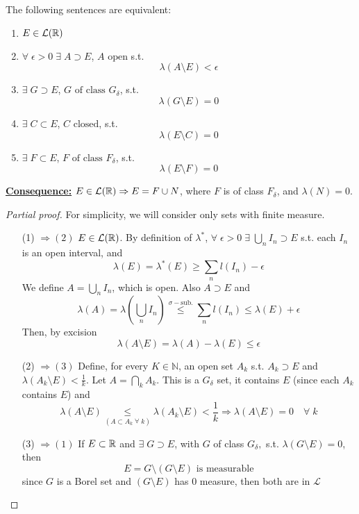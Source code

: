 \begin{theorem}
    The following sentences are equivalent:
    \begin{enumerate}
        \item \(E \in \mathcal{L}(\mathbb{R})\)
        \item \(\forall \; \epsilon > 0 \; \exists \; A \supset E\), \(A \mbox{ open}\) s.t.
        \[
            \lambda \left(A \setminus E\right) < \epsilon
        \]
        \item \(\exists \; G \supset E\), \(G \mbox{ of class } G_{\delta}\), s.t. 
        \[
            \lambda(G\setminus E) = 0
        \]
        \item \(\exists \; C \subset E\), \(C \mbox{ closed}\), s.t. 
        \[
            \lambda(E\setminus C) = 0
        \]
        \item \(\exists \; F \subset E\), \(F \mbox{ of class } F_{\delta}\), s.t. 
        \[
            \lambda(E\setminus F) = 0
        \]
    \end{enumerate}
\end{theorem}
\noindent\underline{\textbf{Consequence:}} \(E \in \mathcal{L}(\mathbb{R}) \Rightarrow E = F \cup N\), where \(F\) is of class \(F_{\delta}\), and \(\lambda(N) = 0\).
\begin{proof}[Partial proof]
    For simplicity, we will consider only sets with finite measure.
    \begin{itemize}
        \item[(1)]\( \Rightarrow (2)\) \(E \in \mathcal{L}(\mathbb{R})\). By definition of \(\lambda^*\), \(\forall \; \epsilon > 0 \; \exists \; \bigcup_n I_n \supset E\) s.t. each \(I_n\) is an open interval, and 
        \[
            \lambda(E) = \lambda^*(E) \geq \sum_n l(I_n) -\epsilon
        \]
        We define \(A = \bigcup_n I_n\), which is open. Also \(A \supset E\) and 
        \[
            \lambda(A)= \lambda\left(\bigcup_n I_n\right) \overset{\sigma-\mbox{sub.}}{\leq} \sum_n l(I_n) \leq \lambda(E) + \epsilon
        \]
        Then, by excision
        \[
            \lambda(A \setminus E) = \lambda(A) - \lambda(E) \leq \epsilon
        \]
        \item[(2)]\( \Rightarrow (3)\) Define, for every \(K \in \mathbb{N}\), an open set \(A_k\) s.t. \(A_k \supset E\) and \(\lambda(A_k \setminus E) < \frac{1}{k}\). Let \(A = \bigcap_k A_k\). This is a \(G_{\delta}\) set, it contains \(E\) (since each \(A_k\) contains \(E\)) and 
        \[
            \lambda(A \setminus E) \underset{(A \subset A_k \; \forall \; k)}{\leq} \lambda(A_k \setminus E) < \frac{1}{k} \Rightarrow \lambda(A \setminus E) = 0 \quad \forall \; k
        \]
        \item[(3)]\( \Rightarrow (1)\) If \(E \subset \mathbb{R}\) and \(\exists\; G \supset E\), with \(G\) of class \(G_{\delta},\) s.t. \(\lambda(G \setminus E) = 0\), then
        \[
            E = G \setminus(G \setminus E) \mbox{ is measurable}
        \]
        since \(G\) is a Borel set and \((G \setminus E)\) has \(0\) measure, then both are in \(\mathcal{L}\)
    \end{itemize}
\end{proof}

